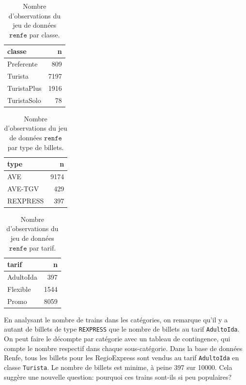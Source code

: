 \documentclass[
  11pt,
  letterpaper,
]{article}
\theoremstyle{definition}
\theoremstyle{definition}
\theoremstyle{definition}
\theoremstyle{definition}
\theoremstyle{remark}
\begin{document}
\begin{table}

\caption{\label{tab:renfe-aed1a}Nombre d'observations du jeu de données $\texttt{renfe}$ par classe.}
\centering
\begin{tabular}[t]{lr}
\toprule
classe & n\\
\midrule
Preferente & 809\\
Turista & 7197\\
TuristaPlus & 1916\\
TuristaSolo & 78\\
\bottomrule
\end{tabular}
\end{table}

\begin{table}

\caption{\label{tab:renfe-aed1b}Nombre d'observations du jeu de données $\texttt{renfe}$ par type de billets.}
\centering
\begin{tabular}[t]{lr}
\toprule
type & n\\
\midrule
AVE & 9174\\
AVE-TGV & 429\\
REXPRESS & 397\\
\bottomrule
\end{tabular}
\end{table}

\begin{table}

\caption{\label{tab:renfe-aed1c}Nombre d'observations du jeu de données $\texttt{renfe}$ par tarif.}
\centering
\begin{tabular}[t]{lr}
\toprule
tarif & n\\
\midrule
AdultoIda & 397\\
Flexible & 1544\\
Promo & 8059\\
\bottomrule
\end{tabular}
\end{table}

En analysant le nombre de trains dans les catégories, on remarque qu'il y a autant de billets de type \texttt{REXPRESS} que le nombre de billets au tarif \texttt{AdultoIda}. On peut faire le décompte par catégorie avec un tableau de contingence, qui compte le nombre respectif dans chaque sous-catégorie. Dans la base de données Renfe, tous les billets pour les RegioExpress sont vendus au tarif \texttt{AdultoIda} en classe \texttt{Turista}. Le nombre de billets est minime, à peine 397 sur 10000. Cela suggère une nouvelle question: pourquoi ces trains sont-ils si peu populaires?
\end{document}
